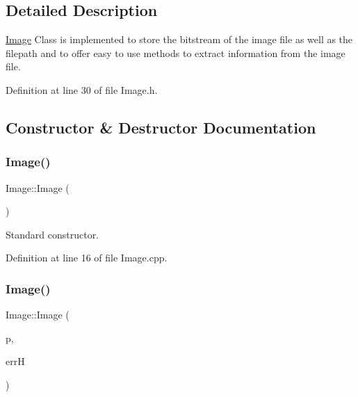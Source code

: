 \subsection{Detailed Description}
\mbox{\hyperlink{classImage}{Image}} Class is implemented to store the bitstream of the image file as well as the filepath and to offer easy to use methods to extract information from the image file. 

Definition at line 30 of file Image.\+h.



\subsection{Constructor \& Destructor Documentation}
\mbox{\label{classImage_a58edd1c45b4faeb5f789b0d036d02313}} 
\subsubsection{\texorpdfstring{Image()}{Image()}\hspace{0.1cm}{\footnotesize\ttfamily [1/3]}}
{\footnotesize\ttfamily Image\+::\+Image (\begin{DoxyParamCaption}{ }\end{DoxyParamCaption})}



Standard constructor. 



Definition at line 16 of file Image.\+cpp.

\mbox{\label{classImage_ae17a70dac9941346eab9e5abef1c03c7}} 
\subsubsection{\texorpdfstring{Image()}{Image()}\hspace{0.1cm}{\footnotesize\ttfamily [2/3]}}
{\footnotesize\ttfamily Image\+::\+Image (\begin{DoxyParamCaption}\item[{std\+::string}]{p,  }\item[{\mbox{\hyperlink{classErrorHandler}{Error\+Handler}} $\ast$}]{errH }\end{DoxyParamCaption})}



